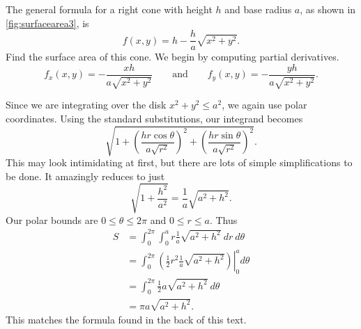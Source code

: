 \begin{example}\label{ex_surfacearea3}
The general formula for a right cone with height $h$ and base radius $a$, as shown in \autoref{fig:surfacearea3}, is
%
%
\[f(x,y) = h-\frac{h}a\sqrt{x^2+y^2}.\]
Find the surface area of this cone.
\solution
We begin by computing partial derivatives. 
\[
f_x(x,y) = -\frac{xh}{a\sqrt{x^2+y^2}}
\qquad\text{and}\qquad
f_y(x,y) = -\frac{yh}{a\sqrt{x^2+y^2}}.
\]

Since we are integrating over the disk $x^2+y^2\le a^2$, we again use polar coordinates. Using the standard substitutions, our integrand becomes
\[\sqrt{1+ \left(\frac{hr\cos\theta}{a\sqrt{r^2}}\right)^2 + \left(\frac{hr\sin\theta}{a\sqrt{r^2}}\right)^2}.\]
This may look intimidating at first, but there are lots of simple simplifications to be done. It amazingly reduces to just
\[\sqrt{1+\frac{h^2}{a^2}} = \frac1a\sqrt{a^2+h^2}.\]
Our polar bounds are $0\leq\theta\leq2\pi$ and $0\leq r\leq a$. Thus
\begin{align*}
S &=	\int_0^{2\pi}\int_0^ar\frac1a\sqrt{a^2+h^2}\ dr\ d\theta\\
	&= \int_0^{2\pi} \left.\left(\frac12r^2\frac1a\sqrt{a^2+h^2}\right)\right|_0^ad\theta \\
	&=	\int_0^{2\pi} \frac12a\sqrt{a^2+h^2} \ d\theta\\
	&= \pi a\sqrt{a^2+h^2}.
\end{align*}
This matches the formula found in the back of this text.
\end{example}

